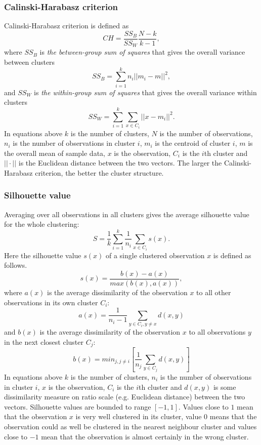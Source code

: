 \subsubsection{Calinski-Harabasz criterion}
Calinski-Harabasz criterion is defined as
\begin{equation}
 CH = \frac{SS_B}{SS_W} \frac{N-k}{k-1},
\end{equation}
where $SS_B$ is \emph{the between-group sum of squares} that gives
the overall variance between clusters
\begin{equation}
 SS_B = \sum_{i=1}^k n_i ||m_i-m||^2,
\end{equation}
and $SS_W$ is \emph{the within-group sum of squares} that gives 
the overall variance within clusters
\begin{equation}
 SS_W = \sum_{i=1}^k \sum_{x\in C_i} ||x-m_i||^2.
\end{equation}
In equations above $k$ is the number of clusters, $N$ is the 
number of observations, $n_i$ is the number of observations in 
cluster $i$, $m_i$ is the centroid of cluster $i$, $m$ is the 
overall mean of sample data, $x$ is the observation, $C_i$ is the 
$i$th cluster and $|| \cdot ||$ is the Euclidean 
distance between the two vectors. The larger the 
Calinski-Harabasz criterion, the better the cluster structure.

\subsubsection{Silhouette value}
Averaging over all observations in all clusters gives the average 
silhouette value for the whole clustering:
\begin{equation}
 S = \frac{1}{k}\sum_{i=1}^k \frac{1}{n_i}\sum_{x \in C_i} s(x).
\end{equation}
Here the silhouette value $s(x)$ of a single clustered observation $x$ is
defined as follows.
\begin{equation}
 s(x) = \frac{b(x) - a(x)}{max(b(x), a(x))},
\end{equation}
where $a(x)$ is the average dissimilarity of the observation $x$ 
to all other observations in its own cluster 
$C_i$:
\begin{equation}
  a(x) = \frac{1}{n_i - 1} \sum_{y \in C_i, y \neq x}d(x,y)  
\end{equation}
and $b(x)$ is the average dissimilarity of the observation $x$ to 
all observations $y$ in the next closest cluster $C_j$:
\begin{equation}
  b(x) = min_{j,j \neq i}[\frac{1}{n_j} \sum_{y \in C_j}d(x,y)]
\end{equation}
In equations above $k$ is the number of clusters, $n_i$ is the 
number of observations in cluster $i$, $x$ is the observation, 
$C_i$ is the $i$th cluster and $d(x,y)$ is some dissimilarity 
measure on ratio scale (e.g. Euclidean distance) between the two 
vectors. Silhouette values are bounded to range $[-1,1]$. Values
close to $1$ mean that the observation $x$ is very well clustered 
in its cluster, value $0$ means that the observation could as well
be clustered in the nearest neighbour cluster and values close to 
$-1$ mean that the observation is almost certainly in the wrong 
cluster.

